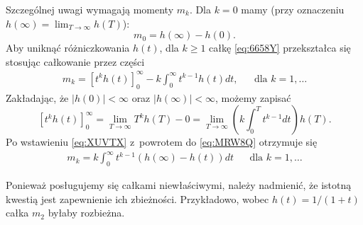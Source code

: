 \documentclass[paper=a4,DIV=12]{lpas}
\begin{document}
\begin{appendices}
  Szczególnej uwagi wymagają momenty $m_k$. Dla $k=0$ mamy (przy oznaczeniu
  $h(\infty) = \lim_{T\to\infty}h(T)$):
  \begin{equation}
    m_0 = h(\infty) - h(0).
    \label{eq:6V264}
  \end{equation}
  Aby uniknąć różniczkowania $h(t)$, dla $k \ge 1$ całkę \eqref{eq:6658Y}
  przekształca się stosując całkowanie przez części
  \begin{equation}
    \begin{aligned}
      & m_k = \left[t^k h(t)\right]_0^{\infty} - k \int_0^{\infty}{t^{k-1} h(t) dt}, &
      & \text{dla } k=1, \dots &
    \end{aligned}
    \label{eq:MRW8Q}
  \end{equation}
  Zakładając, że $|h(0)| < \infty$ oraz $|h(\infty)| < \infty$, możemy zapisać
  \begin{equation}
    \left[t^k h(t)\right]_0^{\infty}
    = \lim_{T\to\infty} T^k h(T) - 0
    = \lim_{T\to\infty}{\left(k \int_0^T t^{k-1} dt\right) h(T)}.
    \label{eq:XUVTX}
  \end{equation}
  Po wstawieniu \eqref{eq:XUVTX} z~powrotem do \eqref{eq:MRW8Q} otrzymuje się
  \begin{equation}
    \begin{aligned}
      & m_k = k \int_0^{\infty}{t^{k-1} (h(\infty) - h(t)) dt} &
      & \text{dla } k=1,\dots &
    \end{aligned}
    \label{eq:CNY34}
  \end{equation}

  Ponieważ posługujemy się całkami niewłaściwymi, należy nadmienić, że istotną
  kwestią jest zapewnienie ich zbieżności. Przykładowo, wobec $h(t)=1/(1+t)$
  całka $m_2$ byłaby rozbieżna.


\end{appendices}
\end{document}
